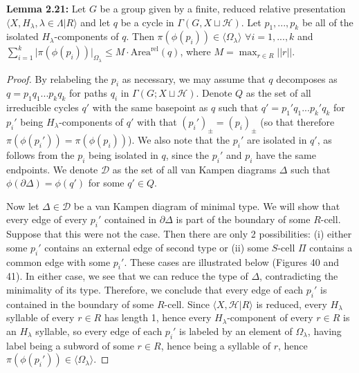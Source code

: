 \documentclass[12pt]{article}
\newcommand{\vs}{\vskip10pt}
\begin{document}
	\vs 
	
	\textbf{Lemma 2.21: } Let $G$ be a group given by a finite, reduced relative presentation $\langle X, H_{\lambda}, \lambda \in \Lambda \vert R \rangle$ and let $q$ be a cycle in $\Gamma(G, X \sqcup \mathcal{H})$. Let $p_1,...,p_k$ be all of the isolated $H_{\lambda}$-components of $q$. Then $\pi(\phi(p_i)) \in \langle \Omega_{\lambda} \rangle$ $\forall i =1,...,k$ and $\sum_{i=1}^k \vert \pi(\phi(p_i)) \vert_{\Omega_{\lambda}} \leq M \cdot \text{Area}^{\text{rel}}(q)$, where $M = \max_{r \in R} \vert \vert r \vert \vert$.
	
	\begin{proof}
		
		By relabeling the $p_i$ as necessary, we may assume that $q$ decomposes as $q = p_1 q_1 ... p_k q_k$ for paths $q_i$ in $\Gamma(G; X \sqcup \mathcal{H})$. Denote $Q$ as the set of all irreducible cycles $q'$ with the same basepoint as $q$ such that $q' = p_1'q_1...p_k' q_k$ for $p_i'$ being $H_{\lambda}$-components of $q'$ with that $(p_i')_{\pm} = (p_i)_{\pm}$ (so that therefore $\pi(\phi(p_i')) = \pi(\phi(p_i))$). We also note that the $p_i'$ are isolated in $q'$, as follows from the $p_i$ being isolated in $q$, since the $p_i'$ and $p_i$ have the same endpoints. We denote $\mathcal{D}$ as the set of all van Kampen diagrams $\Delta$ such that $\phi(\partial \Delta) = \phi(q')$ for some $q' \in Q$. 
		
		\vs 
		
		Now let $\Delta \in \mathcal{D}$ be a van Kampen diagram of minimal type. We will show that every edge of every $p_i'$ contained in $\partial \Delta$ is part of the boundary of some $R$-cell. Suppose that this were not the case. Then there are only 2 possibilities: (i) either some $p_i'$ contains an external edge of second type or (ii) some $S$-cell $\Pi$ contains a common edge with some $p_i'$. These cases are illustrated below (Figures 40 and 41). In either case, we see that we can reduce the type of $\Delta$, contradicting the minimality of its type. Therefore, we conclude that every edge of each $p_i'$ is contained in the boundary of some $R$-cell. Since $\langle X, \mathcal{H} \vert R \rangle$ is reduced, every $H_{\lambda}$ syllable of every $r \in R$ has length 1, hence every $H_\lambda$-component of every $r \in R$ is an $H_\lambda$ syllable, so every edge of each $p_i'$ is labeled by an element of $\Omega_{\lambda}$, having label being a subword of some $r \in R$, hence being a syllable of $r$, hence $\pi(\phi(p_i')) \in \langle \Omega_{\lambda} \rangle$. 
		

\end{proof}
\end{document}
